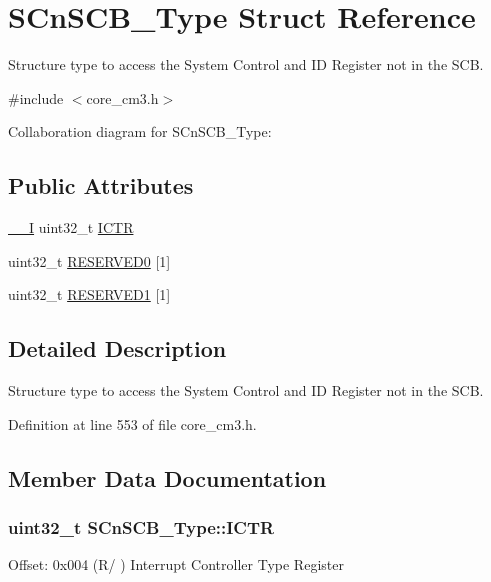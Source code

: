 \hypertarget{structSCnSCB__Type}{}\section{S\+Cn\+S\+C\+B\+\_\+\+Type Struct Reference}
\label{structSCnSCB__Type}


Structure type to access the System Control and ID Register not in the S\+CB.  




{\ttfamily \#include $<$core\+\_\+cm3.\+h$>$}



Collaboration diagram for S\+Cn\+S\+C\+B\+\_\+\+Type\+:
\subsection*{Public Attributes}
\begin{DoxyCompactItemize}
\item 
\hyperlink{core__cm3_8h_af63697ed9952cc71e1225efe205f6cd3}{\+\_\+\+\_\+I} uint32\+\_\+t \hyperlink{structSCnSCB__Type_ad99a25f5d4c163d9005ca607c24f6a98}{I\+C\+TR}
\item 
uint32\+\_\+t \hyperlink{structSCnSCB__Type_afe1d5fd2966d5062716613b05c8d0ae1}{R\+E\+S\+E\+R\+V\+E\+D0} \mbox{[}1\mbox{]}
\item 
uint32\+\_\+t \hyperlink{structSCnSCB__Type_a7343aadfc9e7a15e58c26b67c5d576c1}{R\+E\+S\+E\+R\+V\+E\+D1} \mbox{[}1\mbox{]}
\end{DoxyCompactItemize}


\subsection{Detailed Description}
Structure type to access the System Control and ID Register not in the S\+CB. 

Definition at line 553 of file core\+\_\+cm3.\+h.



\subsection{Member Data Documentation}
\subsubsection[{\texorpdfstring{I\+C\+TR}{ICTR}}]{ uint32\+\_\+t S\+Cn\+S\+C\+B\+\_\+\+Type\+::\+I\+C\+TR}\hypertarget{structSCnSCB__Type_ad99a25f5d4c163d9005ca607c24f6a98}{}\label{structSCnSCB__Type_ad99a25f5d4c163d9005ca607c24f6a98}
Offset\+: 0x004 (R/ ) Interrupt Controller Type Register 

